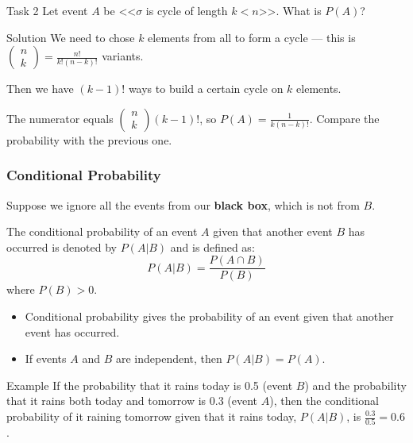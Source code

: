 \documentclass[fullscreen=true, bookmarks=true, hyperref={pdfencoding=unicode}]{beamer}
\begin{document}
\begin{frame}{Task 2}
  Let event $A$ be <<$\sigma$ is cycle of length $k < n$>>. What is $P(A)$?

  \vspace{1cm}
  \pause
  \begin{block}{Solution}
    We need to chose $k$ elements from all to form a cycle — this is 
    $\begin{pmatrix}
      n \\ k
    \end{pmatrix} = \frac{n!}{k!(n-k)!}$ variants.

    \vspace{1cm}
    \pause
    Then we have $(k-1)!$ ways to build a certain cycle on $k$ elements.

    \vspace{1cm}
    \pause
    The numerator equals $\begin{pmatrix}
      n \\ k
    \end{pmatrix} (k-1)!$, so $P(A) = \frac{1}{k(n-k)!}$. 
    Compare the probability with the previous one.
  \end{block}

\end{frame}


\begin{frame}
  \frametitle{Conditional Probability}
  Suppose we ignore all the events from our \textbf{black box}, 
  which is not from $B$.

  \pause
  \begin{definition}
    The conditional probability of an event $A$ given that another event $B$ 
    has occurred is denoted by $P(A|B)$ and is defined as:
    \[
    P(A|B) = \frac{P(A \cap B)}{P(B)} 
    \]
    where $P(B) > 0$.
  \end{definition}
  
  \begin{itemize}
    \pause\item Conditional probability gives the probability of an event given that another event has occurred.
    \pause\item If events $A$ and $B$ are independent, then $P(A|B) = P(A)$.
  \end{itemize}

\end{frame}


\begin{frame}{Example}
  If the probability that it rains today is 0.5 (event $B$) and 
  the probability that it rains both today and tomorrow is 0.3 (event $A$), 
  then the conditional probability of it raining tomorrow given that 
  it rains today, $P(A|B)$, is $\frac{0.3}{0.5} = 0.6$.
\end{frame}
\end{document}
